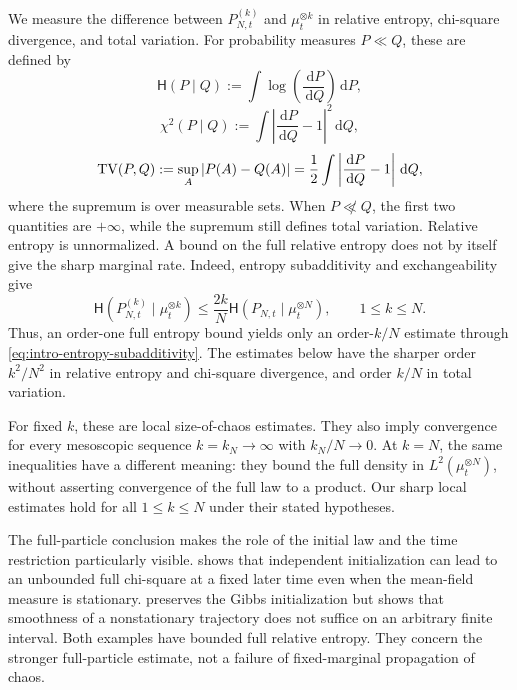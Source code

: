 \documentclass[11pt,reqno]{amsart}
\numberwithin{equation}{section}
\theoremstyle{plain}
\theoremstyle{remark}
\newcommand{\Hr}{\mathsf H}\newcommand{\dd}{\,\mathrm d}
\begin{document}
We measure the difference between $P_{N,t}^{(k)}$ and $\mu_t^{\otimes k}$ in relative entropy, chi-square divergence, and total variation. For probability measures $P\ll Q$, these are defined by
\begin{equation}\label{eq:intro-entropy-definition}
 \Hr(P\mid Q):=\int\log\!\left(\frac{\dd P}{\dd Q}\right)\dd P,
\end{equation}
\begin{equation}\label{eq:intro-chi-definition}
 \chi^2(P\mid Q):=\int\left|\frac{\dd P}{\dd Q}-1\right|^2\dd Q,
\end{equation}
\begin{equation}\label{eq:intro-TV-definition}
 \TV(P,Q):=\sup_{A}|P(A)-Q(A)|
 =\frac12\int\left|\frac{\dd P}{\dd Q}-1\right|\dd Q,
\end{equation}
where the supremum is over measurable sets. When $P\not\ll Q$, the first two quantities are $+\infty$, while the supremum still defines total variation. Relative entropy is unnormalized. A bound on the full relative entropy does not by itself give the sharp marginal rate. Indeed, entropy subadditivity and exchangeability give
\begin{equation}\label{eq:intro-entropy-subadditivity}
 \Hr(P_{N,t}^{(k)}\mid\mu_t^{\otimes k})
 \le\frac{2k}{N}\Hr(P_{N,t}\mid\mu_t^{\otimes N}),\qquad 1\le k\le N.
\end{equation}
Thus, an order-one full entropy bound yields only an order-$k/N$ estimate through \eqref{eq:intro-entropy-subadditivity}. The estimates below have the sharper order $k^2/N^2$ in relative entropy and chi-square divergence, and order $k/N$ in total variation.



For fixed $k$, these are local size-of-chaos estimates. They also imply convergence for every mesoscopic sequence $k=k_N\to\infty$ with $k_N/N\to0$. At $k=N$, the same inequalities have a different meaning: they bound the full density in $L^2(\mu_t^{\otimes N})$, without asserting convergence of the full law to a product. Our sharp local estimates hold for all $1\le k\le N$ under their stated hypotheses.


The full-particle conclusion makes the role of the initial law and the time restriction particularly visible.  shows that independent initialization can lead to an unbounded full chi-square at a fixed later time even when the mean-field measure is stationary. { preserves the Gibbs initialization but shows that smoothness of a nonstationary trajectory does not suffice on an arbitrary finite interval.} Both examples have bounded full relative entropy. They concern the stronger full-particle estimate, not a failure of fixed-marginal propagation of chaos.
\end{document}
